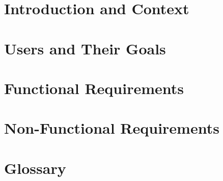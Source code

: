 \documentclass[12pt]{article}
\begin{document}
	\section{Introduction and Context}
		

	\section{Users and Their Goals}


	\section{Functional Requirements}


	\section{Non-Functional Requirements}


	\section{Glossary}
\end{document}
